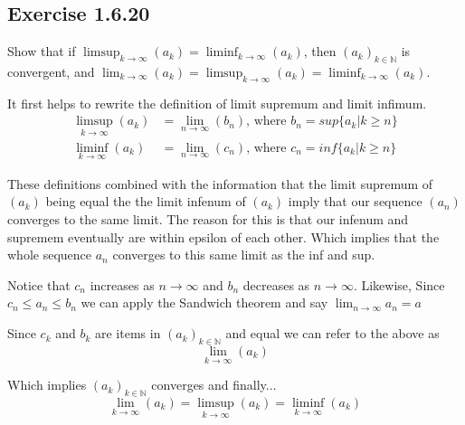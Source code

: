 \documentclass{tufte-book}
\theoremstyle{mytheoremstyle}
\theoremstyle{mylemstyle}
\theoremstyle{mydefstyle}
\begin{document}
\subsection{Exercise 1.6.20}
Show that if  $\limsup_{k \to \infty}(a_k) = \liminf_{k \to \infty}(a_k)$, then $(a_k)_{k \in \mathbb{N}}$ is convergent, and $\lim_{k \to \infty}(a_k) = \limsup_{k \to \infty}(a_k) = \liminf_{k \to \infty}(a_k)$.

It first helps to rewrite the definition of limit supremum and limit infimum.
\begin{align*}
	\limsup_{k \to \infty}(a_k) &= \lim_{n \to \infty}(b_n) \text{, where } b_n = sup\{a_k | k \geq n\} \\
    \liminf_{k \to \infty}(a_k) &= \lim_{n \to \infty}(c_n) \text{, where } c_n = inf\{a_k| k \geq n\}
\end{align*}



These definitions combined with the information that the limit supremum of $(a_k)$ being equal the the limit infenum of $(a_k)$ imply that our sequence $(a_n)$ converges to the same limit.  The reason for this is that our infenum and supremem eventually are within epsilon of each other.  Which implies that the whole sequence $a_n$ converges to this same limit as the inf and sup.

Notice that $c_n$ increases as $n \to \infty$ and $b_n$ decreases as $n \to \infty$.
Likewise, Since $c_n \leq a_n \leq b_n$ we can apply the Sandwich theorem and say $\lim_{n \to \infty}a_n = a$ 

Since $c_k$ and $b_k$ are items in $(a_k)_{k \in \mathbb{N}}$ and equal we can refer to the above as 
\[\lim_{k \to \infty}(a_k)\] 

  Which implies $(a_k)_{k \in \mathbb{N}}$ converges and finally...
\[\lim_{k \to \infty}(a_k) = \limsup_{k \to \infty}(a_k) = \liminf_{k \to \infty}(a_k) \]
\end{document}
